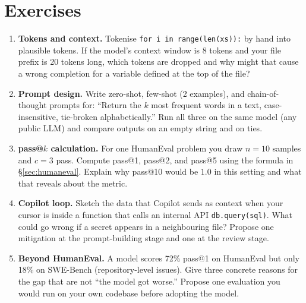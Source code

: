 \section{Exercises}
\label{sec:ch02-exercises}
\begin{enumerate}[label=E2.\arabic*, leftmargin=*, itemsep=0.7em]
    \item \textbf{Tokens and context.} Tokenise \texttt{for i in range(len(xs)):} by hand into plausible tokens. If the model's context window is 8 tokens and your file prefix is 20 tokens long, which tokens are dropped and why might that cause a wrong completion for a variable defined at the top of the file?
    \item \textbf{Prompt design.} Write zero-shot, few-shot (2 examples), and chain-of-thought prompts for: ``Return the $k$ most frequent words in a text, case-insensitive, tie-broken alphabetically.'' Run all three on the same model (any public LLM) and compare outputs on an empty string and on ties.
    \item \textbf{pass@$k$ calculation.} For one HumanEval problem you draw $n=10$ samples and $c=3$ pass. Compute pass@1, pass@2, and pass@5 using the formula in \S\ref{sec:humaneval}. Explain why pass@10 would be $1.0$ in this setting and what that reveals about the metric.
    \item \textbf{Copilot loop.} Sketch the data that Copilot sends as context when your cursor is inside a function that calls an internal API \texttt{db.query(sql)}. What could go wrong if a secret appears in a neighbouring file? Propose one mitigation at the prompt-building stage and one at the review stage.
    \item \textbf{Beyond HumanEval.} A model scores 72\% pass@1 on HumanEval but only 18\% on SWE-Bench (repository-level issues). Give three concrete reasons for the gap that are not ``the model got worse.'' Propose one evaluation you would run on your own codebase before adopting the model.
\end{enumerate}
